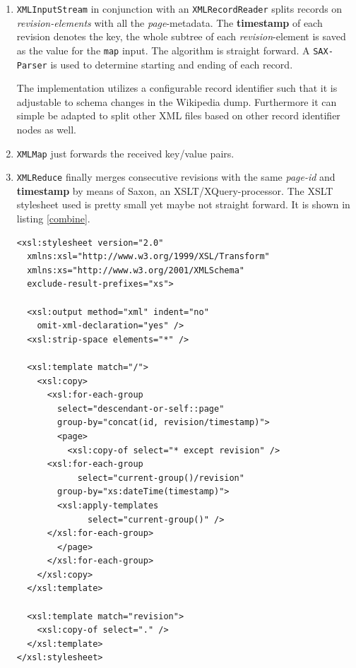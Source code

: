 \begin{enumerate}
\item \texttt{XMLInputStream} in conjunction with an \texttt{XMLRecordReader} splits records on \emph{revision-elements} with all the \emph{page}-metadata. The \textbf{timestamp} of each revision denotes the key, the whole subtree of each \emph{revision}-element is saved as the value for the \texttt{map} input. The algorithm is straight forward. A \texttt{SAX-Parser} is used to determine starting and ending of each record.

The implementation utilizes a configurable record identifier such that it is adjustable to schema changes in the Wikipedia dump. Furthermore it can simple be adapted to split other XML files based on other record identifier nodes as well.

\item \texttt{XMLMap} just forwards the received key/value pairs.
\item \texttt{XMLReduce} finally merges consecutive revisions with the same \emph{page-id} and \textbf{timestamp} by means of Saxon, an XSLT/XQuery-processor. The XSLT stylesheet used is pretty small yet maybe not straight forward. It is shown in listing \ref{combine}.

\begin{lstlisting}[caption=XSLT stylesheet to combine consecutive pages/revisions]
<xsl:stylesheet version="2.0" 
  xmlns:xsl="http://www.w3.org/1999/XSL/Transform" 
  xmlns:xs="http://www.w3.org/2001/XMLSchema"
  exclude-result-prefixes="xs">

  <xsl:output method="xml" indent="no" 
    omit-xml-declaration="yes" />
  <xsl:strip-space elements="*" />

  <xsl:template match="/">
    <xsl:copy>
      <xsl:for-each-group 
        select="descendant-or-self::page" 
        group-by="concat(id, revision/timestamp)">
        <page>
          <xsl:copy-of select="* except revision" />
	  <xsl:for-each-group 
            select="current-group()/revision"
	    group-by="xs:dateTime(timestamp)">
	    <xsl:apply-templates 
              select="current-group()" />
	  </xsl:for-each-group>
        </page>
      </xsl:for-each-group>
    </xsl:copy>
  </xsl:template>

  <xsl:template match="revision">
    <xsl:copy-of select="." />
  </xsl:template>
</xsl:stylesheet>
\end{lstlisting}
\label{combine}
\end{enumerate}


